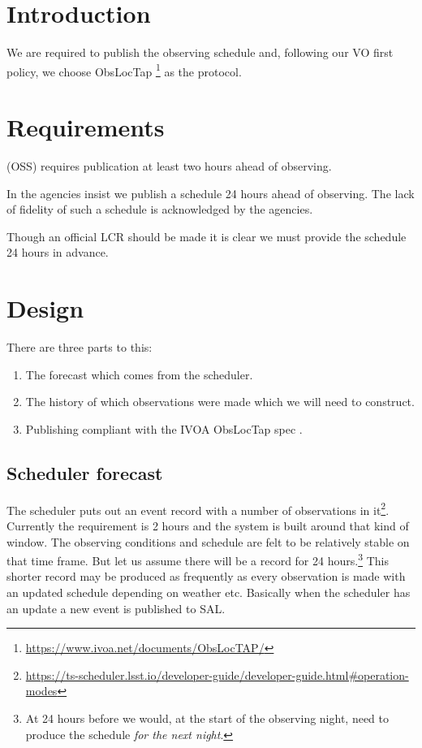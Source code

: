\def\DB{ObsLocTAP database }

\section{Introduction}
We are required to publish the observing schedule and, following our VO first policy, we  choose ObsLocTap \citep{2021ivoa.spec.0724S} \footnote{\url{https://www.ivoa.net/documents/ObsLocTAP/}} as the protocol.

\section{Requirements}

 (OSS) requires publication at least two hours ahead of observing.

In  the agencies insist we publish a schedule 24 hours ahead of observing.
The lack of fidelity of such a schedule is acknowledged by the agencies.

Though an official LCR should be made it is clear we must provide the schedule 24 hours in advance.

\section{Design}


There are three parts to this:


\begin{enumerate}
\item The forecast  which comes from the scheduler.
\item The history of which observations were made which we will need to construct.
\item Publishing compliant with the IVOA ObsLocTap  spec \citep{2021ivoa.spec.0724S}.
\end{enumerate}

\subsection{Scheduler forecast} \label{sec:forecast}
The scheduler puts out an event record with a number of observations in it\footnote{\url{https://ts-scheduler.lsst.io/developer-guide/developer-guide.html\#operation-modes}}.
Currently the requirement is 2 hours and the system is built around that kind of window.
The observing conditions and schedule are felt to be relatively stable on that time frame.
But let us assume there will be  a record for 24 hours.\footnote{
At 24 hours before we would, at the start of the observing night, need to produce the schedule  \emph{for the next night}.
}
This shorter record may be produced as frequently as every observation is made with an updated schedule depending on weather etc.
Basically when the scheduler has an update a new event is published to SAL.

